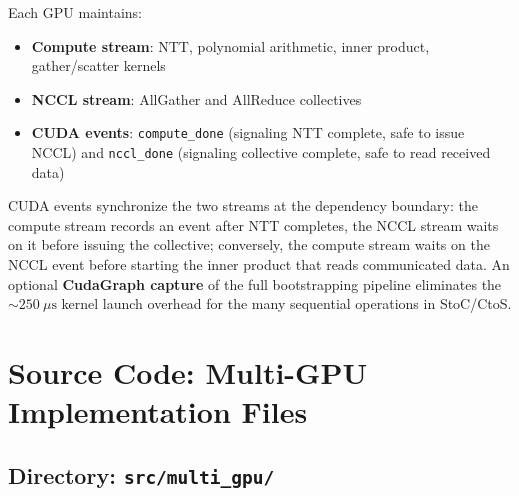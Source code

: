 \documentclass[11pt,letterpaper]{article}
\begin{document}
Each GPU maintains:
\begin{itemize}
  \item \textbf{Compute stream}: NTT, polynomial arithmetic, inner product,
    gather/scatter kernels
  \item \textbf{NCCL stream}: AllGather and AllReduce collectives
  \item \textbf{CUDA events}: \texttt{compute\_done} (signaling NTT
    complete, safe to issue NCCL) and \texttt{nccl\_done} (signaling
    collective complete, safe to read received data)
\end{itemize}

CUDA events synchronize the two streams at the dependency boundary: the compute stream
records an event after NTT completes, the NCCL stream waits on it before issuing the
collective; conversely, the compute stream waits on the NCCL event before starting the
inner product that reads communicated data.
An optional \textbf{CudaGraph capture} of the full bootstrapping pipeline eliminates the
$\sim 250\ \mu\text{s}$ kernel launch overhead for the many sequential operations in
StoC/CtoS.

\section{Source Code: Multi-GPU Implementation Files}
\label{sec:srcfiles}

\subsection{Directory: \texttt{src/multi\_gpu/}}
\end{document}
